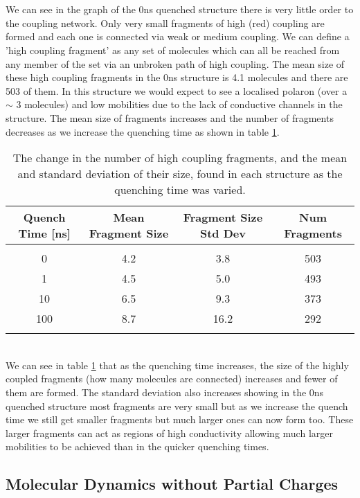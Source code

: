 \\\\
We can see in the graph of the 0ns quenched structure there is very little order to the coupling network. Only very small fragments of high (red) coupling are formed and each one is connected via weak or medium coupling. We can define a 'high coupling fragment' as any set of molecules which can all be reached from any member of the set via an unbroken path of high coupling. The mean size of these high coupling fragments in the 0ns structure is 4.1 molecules and there are 503 of them. In this structure we would expect to see a localised polaron (over a $\sim$ 3 molecules) and low mobilities due to the lack of conductive channels in the structure. The mean size of fragments increases and the number of fragments decreases as we increase the quenching time as shown in table \ref{tab:cluster_sizes}.
\\
\begin{table}[h]
	\begin{tabular}{cccc}
		\textbf{Quench Time} [ns] & \textbf{Mean Fragment Size} & \textbf{Fragment Size Std Dev} & \textbf{Num Fragments} \\
		\hline &&&\\
		0 & 4.2 & 3.8 & 503 \\
		1 & 4.5 & 5.0 & 493 \\
		10 & 6.5 & 9.3 & 373 \\
		100 & 8.7 & 16.2 & 292 \\
		\hline &&&\\
	\end{tabular}
	\caption{\label{tab:cluster_sizes}The change in the number of high coupling fragments, and the mean and standard deviation of their size, found in each structure as the quenching time was varied.}
\end{table}
\\
We can see in table \ref{tab:cluster_sizes} that as the quenching time increases, the size of the highly coupled fragments (how many molecules are connected) increases and fewer of them are formed. The standard deviation also increases showing in the 0ns quenched structure most fragments are very small but as we increase the quench time we still get smaller fragments but much larger ones can now form too. These larger fragments can act as regions of high conductivity allowing much larger mobilities to be achieved than in the quicker quenching times.

\clearpage
\subsection{Molecular Dynamics without Partial Charges}


\label{sect:partial_charge_importance}

